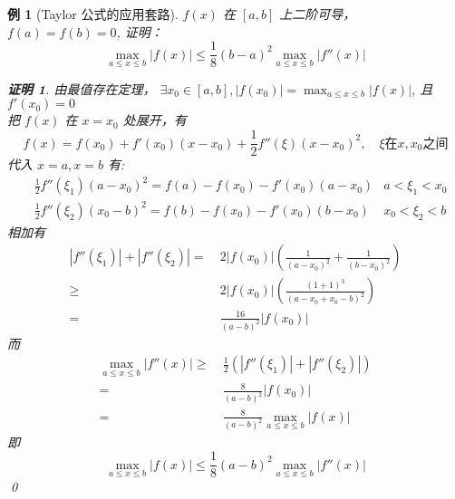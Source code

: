 \documentclass{ctexart}
\newcommand{\。}{．} %
\newenvironment{zise}{
    \begin{tcolorbox}[enhanced, breakable, colback=qzi, boxrule=0pt, frame hidden,
        borderline west={0.7mm}{0.1mm}{szi}]
    }
    {\end{tcolorbox}}
\theoremstyle{t} %
\newtheorem{lthj}{\color{szi} 例}[subsection]
\newtheorem*{zmhj}{\color{slan} 证明}
\newenvironment{lt}{\begin{zise}\begin{lthj}}{\end{lthj}\end{zise}}
\begin{document}
\begin{lt}[Taylor 公式的应用套路]
    $f(x)$ 在 $[a, b]$ 上二阶可导， $f(a) = f(b) = 0$, 证明：
    \[
        \max_{a \leqslant x \leqslant b}\left\lvert f(x)\right\rvert \leqslant \frac{1}{8} (b - a)^2 \max_{a \leqslant x \leqslant b}\left\lvert f''(x)\right\rvert 
    \]
    \begin{zmhj}
        由最值存在定理， $\exists x_0 \in [a, b], \left\lvert f(x_0)\right\rvert = \max_{a \leqslant x \leqslant b}\left\lvert f(x)\right\rvert$, 且 $f'(x_0) = 0$ \\
        把 $f(x)$ 在 $x = x_0$ 处展开，有
        \[
            f(x) = f(x_0) + f'(x_0)(x - x_0) + \frac{1}{2}f''(\xi)(x - x_0)^2, \quad \xi \text{在} x, x_0 \text{之间}
        \]
        代入 $x = a, x = b$ 有:
        \begin{align*}
            & \frac{1}{2}f''(\xi_1)(a - x_0)^2 = f(a) - f(x_0) - f'(x_0)(a - x_0) & a < \xi_1 < x_0 \\
            & \frac{1}{2}f''(\xi_2)(x_0 - b)^2 = f(b) - f(x_0) - f'(x_0)(b - x_0) & x_0 < \xi_2 < b
        \end{align*}
        相加有
        \begin{align*}
            \left\lvert f''(\xi_1)\right\rvert  + \left\lvert f''(\xi_2)\right\rvert  =\  & 2\left\lvert f(x_0)\right\rvert \left(\frac{1}{(a - x_0)^2} + \frac{1}{(b - x_0)^2}\right) \\
            \geqslant \ & 2\left\lvert f(x_0)\right\rvert\left(\frac{(1 + 1)^3}{(a - x_0 + x_0 - b)^2}\right)\\
            = \ & \frac{16}{(a - b)^2}\left\lvert f(x_0)\right\rvert
        \end{align*}
        而
        \begin{align*}
            \max_{a \leqslant x \leqslant b}\left\lvert f''(x)\right\rvert  \geqslant\ & \frac{1}{2}\left(\left\lvert f''(\xi_1)\right\rvert  + \left\lvert f''(\xi_2)\right\rvert\right) \\
            = \ & \frac{8}{(a - b)^2}\left\lvert f(x_0)\right\rvert \\
            = \ & \frac{8}{(a - b)^2}\max_{a \leqslant x \leqslant b}\left\lvert f(x)\right\rvert
        \end{align*}
        即 \[\max_{a \leqslant x \leqslant b}\left\lvert f(x)\right\rvert \leqslant \frac{1}{8}(a - b)^2\max_{a \leqslant x \leqslant b}\left\lvert f''(x)\right\rvert \] \qed
    \end{zmhj}
\end{lt}
\end{document}
